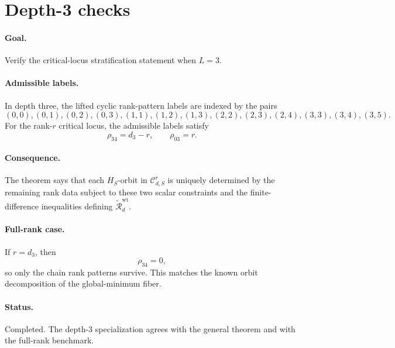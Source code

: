 \section*{Depth-3 checks}

\paragraph{Goal.}
Verify the critical-locus stratification statement when \(L=3\).

\paragraph{Admissible labels.}
In depth three, the lifted cyclic rank-pattern labels are indexed by the pairs
\[
(0,0),(0,1),(0,2),(0,3),(1,1),(1,2),(1,3),(2,2),(2,3),(2,4),(3,3),(3,4),(3,5).
\]
For the rank-\(r\) critical locus, the admissible labels satisfy
\[
\rho_{34}=d_3-r,
\qquad
\rho_{03}=r.
\]

\paragraph{Consequence.}
The theorem says that each \(H_S\)-orbit in \(\mathcal C_{d,S}^r\) is uniquely
determined by the remaining rank data subject to these two scalar constraints
and the finite-difference inequalities defining
\(\widetilde{\mathcal R}_d^{\mathrm{wt}}\).

\paragraph{Full-rank case.}
If \(r=d_3\), then
\[
\rho_{34}=0,
\]
so only the chain rank patterns survive. This matches the known orbit
decomposition of the global-minimum fiber.

\paragraph{Status.}
Completed. The depth-3 specialization agrees with the general theorem and with
the full-rank benchmark.
